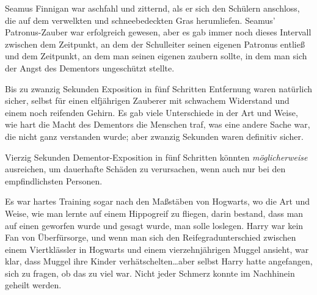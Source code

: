 \later

Seamus Finnigan war aschfahl und zitternd, als er sich den Schülern anschloss, die auf dem verwelkten und schneebedeckten Gras herumliefen. Seamus’ Patronus-Zauber war erfolgreich gewesen, aber es gab immer noch dieses Intervall zwischen dem Zeitpunkt, an dem der Schulleiter seinen eigenen Patronus entließ und dem Zeitpunkt, an dem man seinen eigenen zaubern sollte, in dem man sich der Angst des Dementors ungeschützt stellte.

Bis zu zwanzig Sekunden Exposition in fünf Schritten Entfernung waren natürlich sicher, selbst für einen elfjährigen Zauberer mit schwachem Widerstand und einem noch reifenden Gehirn. Es gab viele Unterschiede in der Art und Weise, wie hart die Macht des Dementors die Menschen traf, was eine andere Sache war, die nicht ganz verstanden wurde; aber zwanzig Sekunden waren definitiv sicher.

Vierzig Sekunden Dementor-Exposition in fünf Schritten könnten \emph{möglicherweise} ausreichen, um dauerhafte Schäden zu verursachen, wenn auch nur bei den empfindlichsten Personen.

Es war hartes Training sogar nach den Maßstäben von Hogwarts, wo die Art und Weise, wie man lernte auf einem Hippogreif zu fliegen, darin bestand, dass man auf einen geworfen wurde und gesagt wurde, man solle loslegen. Harry war kein Fan von Überfürsorge, und wenn man sich den Reifegradunterschied zwischen einem Viertklässler in Hogwarts und einem vierzehnjährigen Muggel ansieht, war klar, dass Muggel ihre Kinder verhätschelten…aber selbst Harry hatte angefangen, sich zu fragen, ob das zu viel war. Nicht jeder Schmerz konnte im Nachhinein geheilt werden.

